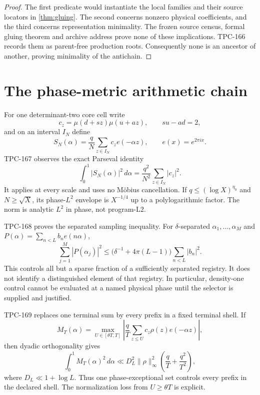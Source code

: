 \documentclass[11pt]{article}
\theoremstyle{definition}
\theoremstyle{remark}
\newcommand{\Ltwo}{\mathrm{L2}}
\begin{document}
\begin{proof}
The first predicate would instantiate the local families and their
source locators in \cref{thm:gluing}.  The second concerns nonzero
physical coefficients, and the third concerns representation
minimality.  The frozen source census, formal gluing theorem and
archive address prove none of these implications.  TPC-166 records
them as parent-free production roots.  Consequently none is an
ancestor of another, proving minimality of the antichain.
\end{proof}

\section{The phase-metric arithmetic chain}

For one determinant-two core cell write
\[
 c_z=\mu(d+sz)\mu(u+az),\qquad su-ad=2,
\]
and on an interval \(I_N\) define
\[
 S_N(\alpha)=\frac qN\sum_{z\in I_N}c_z e(-\alpha z),
 \qquad e(x)=e^{2\pi i x}.
\tag{6}\label{eq:twist}
\]
TPC-167 observes the exact Parseval identity
\[
 \int_0^1|S_N(\alpha)|^2\,d\alpha
 =\frac{q^2}{N^2}\sum_{z\in I_N}|c_z|^2.
\tag{7}\label{eq:parseval}
\]
It applies at every scale and uses no M\"obius cancellation.  If
\(q\le(\log X)^{\eta_0}\) and \(N\ge\sqrt X\), its phase-\(L^2\)
envelope is \(X^{-1/4}\) up to a polylogarithmic factor.  The norm is
analytic \(L^2\) in phase, not program-\(\Ltwo\).

TPC-168 proves the separated sampling inequality.  For
\(\delta\)-separated \(\alpha_1,\ldots,\alpha_M\) and
\(P(\alpha)=\sum_{n<L}b_ne(n\alpha)\),
\[
 \sum_{j=1}^M|P(\alpha_j)|^2
 \le \bigl(\delta^{-1}+4\pi(L-1)\bigr)
       \sum_{n<L}|b_n|^2.
\tag{8}\label{eq:large-sieve}
\]
This controls all but a sparse fraction of a sufficiently separated
registry.  It does not identify a distinguished element of that
registry.  In particular, density-one control cannot be evaluated at
a named physical phase until the selector is supplied and justified.

TPC-169 replaces one terminal sum by every prefix in a fixed
terminal shell.  If
\[
 M_T(\alpha)
 =\max_{U\in[\theta T,T]}
   \left|\frac qT\sum_{z\le U}c_z\rho(z)e(-\alpha z)\right|,
\]
then dyadic orthogonality gives
\[
 \int_0^1M_T(\alpha)^2\,d\alpha
 \ll D_L^2\|\rho\|_\infty^2
       \left(\frac qT+\frac{q^2}{T^2}\right),
\tag{9}\label{eq:maximal}
\]
where \(D_L\ll1+\log L\).  Thus one phase-exceptional set controls
every prefix in the declared shell.  The normalization loss from
\(U\ge\theta T\) is explicit.
\end{document}
